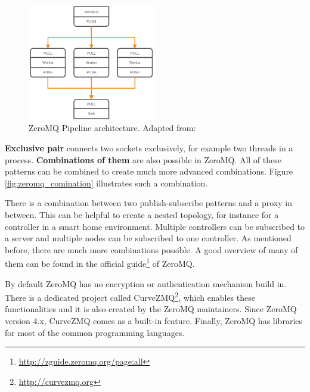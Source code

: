 \begin{figure}[H]
    \centering
    \includegraphics[width=0.5\textwidth]{resources/images/zeromq-vernitlator.png}
    \caption[ZeroMQ Pipeline architecture]{ZeroMQ Pipeline architecture. Adapted from: \autocite{ZeroMQ:Guide}}
    \label{fig:zeromq_pipeline}
\end{figure}

\textbf{Exclusive pair} connects two sockets exclusively, for example two threads in a process.\autocite[cf.]{ZeroMQ:Guide}
\newline
\textbf{Combinations of them} are also possible in ZeroMQ.
All of these patterns can be combined to create much more advanced combinations.
Figure \ref{fig:zeromq_comination} illustrates such a combination.\newline

There is a combination between two publish-subscribe patterns and a proxy in between.
This can be helpful to create a nested topology, for instance for a controller in a smart home environment.
Multiple controllers can be subscribed to a server and multiple nodes can be subscribed to one controller.
As mentioned before, there are much more combinations possible.
A good overview of many of them can be found in the official guide\footnote{\url{http://zguide.zeromq.org/page:all}} of ZeroMQ.\newline

By default ZeroMQ has no encryption or authentication mechanism build in.
There is a dedicated project called CurveZMQ\footnote{\url{http://curvezmq.org}}, which enables these functionalities and it is also created by the ZeroMQ maintainers.
Since ZeroMQ version 4.x, CurveZMQ comes as a built-in feature.
Finally, ZeroMQ has libraries for most of the common programming languages.\newline


